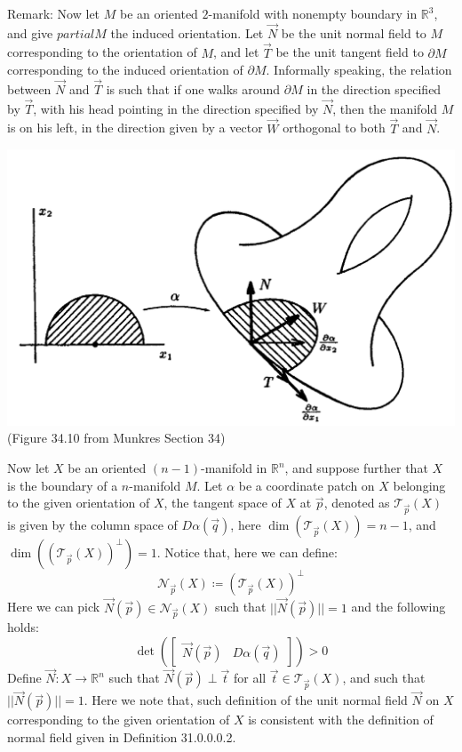 \documentclass[15pt]{book}
\theoremstyle{break}
\theoremstyle{break}
\newcommand{\R}{\mathbb{R}}
\newcommand{\T}{\mathcal{T}}
\newcommand{\bmat}[1]{\begin{bmatrix} #1 \end{bmatrix}}
\newcommand{\remark}{\color{blue}Remark: \color{black}}
\begin{document}
\remark Now let $M$ be an oriented $2$-manifold with nonempty boundary in $\R^3$, and give $partial M$ the induced orientation. Let $\vec{N}$ be the unit normal field to $M$ corresponding to the orientation of $M$, and let $\vec{T}$ be the unit tangent field to $\partial M$ corresponding to the induced orientation of $\partial M$. Informally speaking, the relation between $\vec{N}$ and $\vec{T}$ is such that if one walks around $\partial M$ in the direction specified by $\vec{T}$, with his head pointing in the direction specified by $\vec{N}$, then the manifold $M$ is on his left, in the direction given by a vector $\vec{W}$ orthogonal to both $\vec{T}$ and $\vec{N}$. \\
\begin{center}
\includegraphics[scale=0.29]{2Orientation.png}\\
(Figure 34.10 from Munkres Section 34)
\end{center}

\hfill\break\hfill\break
Now let $X$ be an oriented $(n-1)$-manifold in $\R^n$, and suppose further that $X$ is the boundary of a $n$-manifold $M$. Let $\alpha$ be a coordinate patch on $X$ belonging to the given orientation of $X$, the tangent space of $X$ at $\vec{p}$, denoted as $\T_{\vec{p}}(X)$ is given by the column space of $D\alpha(\vec{q})$, here $\dim(\T_{\vec{p}}(X)) = n-1$, and $\dim((\T_{\vec{p}}(X))^{\perp}) = 1$. Notice that, here we can define: 
$$\mathcal{N}_{\vec{p}}(X) \coloneqq (\T_{\vec{p}}(X))^\perp$$ 
Here we can pick $\vec{N}(\vec{p}) \in \mathcal{N}_{\vec{p}}(X)$ such that $||\vec{N}(\vec{p})|| = 1$ and the following holds: 
$$\det\left(\bmat{\vec{N}(\vec{p}) & D\alpha(\vec{q})}\right) >0$$ 
Define $\vec{N}:X \to \R^n$ such that $\vec{N}(\vec{p}) \perp \vec{t}$ for all $\vec{t}\in \T_{\vec{p}}(X)$, and such that $||\vec{N}(\vec{p})|| = 1$. Here we note that, such definition of the unit normal field $\vec{N}$ on $X$ corresponding to the given orientation of $X$ is consistent with the definition of normal field given in Definition 31.0.0.0.2. \\
\end{document}
